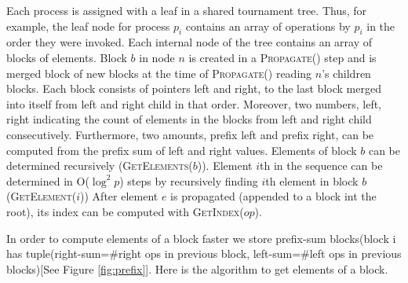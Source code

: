 \documentclass[10pt]{article}
\theoremstyle{definition}
\begin{document}
Each process is assigned with a leaf in a shared tournament tree. Thus, for example, the leaf node for process $p_i$ contains an array of operations by $p_i$ in the order they were invoked.
Each internal node of the tree contains an array of blocks of elements.
Block $b$ in node $n$ is created in a \textsc{Propagate}() step and is merged block of new blocks at the time of \textsc{Propagate}() reading $n$'s children blocks. Each block consists of pointers left and right, to the last block merged into itself from left and right child in that order. Moreover, two numbers, left, right indicating the count of elements in the blocks from left and right child consecutively. Furthermore, two amounts, prefix left and prefix right, can be computed from the prefix sum of left and right values.
Elements of block $b$ can be determined recursively (\textsc{GetElements($b$)}).
Element $i$th in the sequence can be determined in \textsc{O}($\log^2 p$) steps by recursively finding $i$th element in block $b$ (\textsc{GetElement($i$)})
After element $e$ is propagated (appended to a block int the root), its index can be computed with \textsc{GetIndex}($op$).


In order to compute elements of a block faster we store prefix-sum blocks(block i has tuple(right-sum=$\#$right ops in previous block, left-sum=$\#$left ops in previous blocks)[See Figure \ref{fig:prefix}]. Here is the algorithm to get elements of a block.
\end{document}
